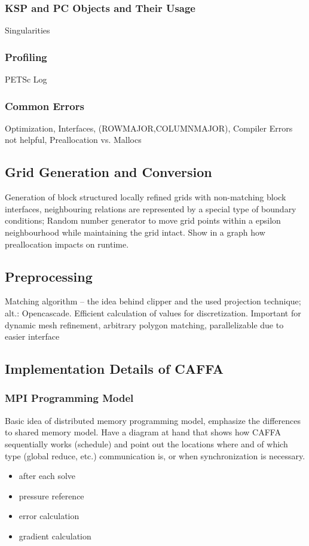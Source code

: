 \documentclass[article,type=msc,colorback,accentcolor=tud2a]{tudthesis}
\begin{document}
      \subsubsection{KSP and PC Objects and Their Usage}

        Singularities

      \subsubsection{Profiling}

        PETSc Log 

      \subsubsection{Common Errors}

      Optimization, Interfaces, (ROWMAJOR,COLUMNMAJOR), Compiler Errors not helpful, Preallocation vs. Mallocs

    \subsection{Grid Generation and Conversion}

      Generation of block structured locally refined grids with non-matching block interfaces, neighbouring relations are represented by a special type of boundary conditions; Random number generator to move grid points within a epsilon neighbourhood while maintaining the grid intact. Show in a graph how preallocation impacts on runtime.
    \subsection{Preprocessing}
    Matching algorithm -- the idea behind clipper and the used projection technique; alt.: Opencascade. Efficient calculation of values for discretization. Important for dynamic mesh refinement, arbitrary polygon matching, parallelizable due to easier interface

    \subsection{Implementation Details of CAFFA}

      \subsubsection{MPI Programming Model}
        Basic idea of distributed memory programming model, emphasize the differences to shared memory model. Have a diagram at hand that shows how CAFFA sequentially works (schedule) and point out the locations where and of which type (global reduce, etc.) communication is, or when synchronization is necessary.
        \begin{itemize}
          \item after each solve
          \item pressure reference
          \item error calculation
          \item gradient calculation
        \end{itemize}
        
\end{document}
